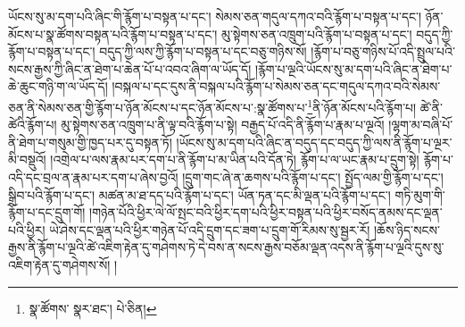 ཡོངས་སུ་མ་དག་པའི་ཞིང་གི་རྙོག་པ་བསྟན་པ་དང་། སེམས་ཅན་གདུལ་དཀའ་བའི་རྙོག་པ་བསྟན་པ་དང་། ཉོན་མོངས་པ་སྣ་ཚོགས་བསྟན་པའི་རྙོག་པ་བསྟན་པ་དང་། མུ་སྟེགས་ཅན་འཁྲུག་པའི་རྙོག་པ་བསྟན་པ་དང་། བདུད་ཀྱི་རྙོག་པ་བསྟན་པ་དང་། བདུད་ཀྱི་ལས་ཀྱི་རྙོག་པ་བསྟན་པ་དང་བཅུ་གཉིས་སོ། །རྙོག་པ་བཅུ་གཉིས་པོ་འདི་སྤྲུལ་པའི་སངས་རྒྱས་ཀྱི་ཞིང་ན་ཐེག་པ་ཆེན་པོ་པ་འབའ་ཞིག་ལ་ཡོད་དོ། །རྙོག་པ་ལྔའི་ཡོངས་སུ་མ་དག་པའི་ཞིང་ན་ཐེག་པ་ཆེ་ཆུང་གཉི་ག་ལ་ཡོད་དོ། །བསྐལ་པ་དང་དུས་ནི་བསྐལ་པའི་རྙོག་པ་སེམས་ཅན་དང་གདུལ་དཀའ་བའི་སེམས་ཅན་ནི་སེམས་ཅན་གྱི་རྙོག་པ་ཉོན་མོངས་པ་དང་ཉོན་མོངས་པ་:སྣ་ཚོགས་པ་\footnote{སྣ་ཚོགས་  སྣར་ཐང་།  པེ་ཅིན། }ནི་ཉོན་མོངས་པའི་རྙོག་པ། ཚེ་ནི་ཚེའི་རྙོག་པ། མུ་སྟེགས་ཅན་འཁྲུག་པ་ནི་ལྟ་བའི་རྙོག་པ་སྟེ། བརྒྱད་པོ་འདི་ནི་རྙོག་པ་རྣམ་པ་ལྔའོ། །ལྷག་མ་བཞི་པོ་ནི་ཐེག་པ་གསུམ་གྱི་ཁྱད་པར་དུ་བསྟན་ཏོ། །ཡོངས་སུ་མ་དག་པའི་ཞིང་ན་བདུད་དང་བདུད་ཀྱི་ལས་ནི་རྙོག་པ་ལྔར་མི་བསྡུའོ། །འགྲེལ་པ་ལས་རྣམ་པར་དག་པ་ནི་རྙོག་པ་མ་ཡིན་པའི་དོན་ཏེ། རྙོག་པ་ལ་ཡང་རྣམ་པ་དྲུག་སྟེ། རྙོག་པ་འདི་དང་བྲལ་ན་རྣམ་པར་དག་པ་ཞེས་བྱའོ། །དྲུག་གང་ཞེ་ན་ཆགས་པའི་རྙོག་པ་དང་། སྤྱོད་ལམ་གྱི་རྙོག་པ་དང་། སྒྲིབ་པའི་རྙོག་པ་དང་། མཚན་མ་ཐ་དད་པའི་རྙོག་པ་དང་། ཡོན་ཏན་དང་མི་ལྡན་པའི་རྙོག་པ་དང་། གཏི་མུག་གི་རྙོག་པ་དང་དྲུག་གོ། །གཉེན་པོའི་ཕྱིར་ལེ་ལོ་སྤང་བའི་ཕྱིར་དག་པའི་ཕྱིར་བསྟན་པའི་ཕྱིར་བསོད་ནམས་དང་ལྡན་པའི་ཕྱིར། ཡེ་ཤེས་དང་ལྡན་པའི་ཕྱིར་གཉེན་པོ་འདི་དྲུག་དང་ཟག་པ་དྲུག་གོ་རིམས་སུ་སྦྱར་རོ། །ཆོས་ཉིད་སངས་རྒྱས་ནི་རྙོག་པ་ལྔའི་ཚེ་འཇིག་རྟེན་དུ་གཤེགས་ཏེ་དེ་བས་ན་སངས་རྒྱས་བཅོམ་ལྡན་འདས་ནི་རྙོག་པ་ལྔའི་དུས་སུ་འཇིག་རྟེན་དུ་གཤེགས་སོ། །
